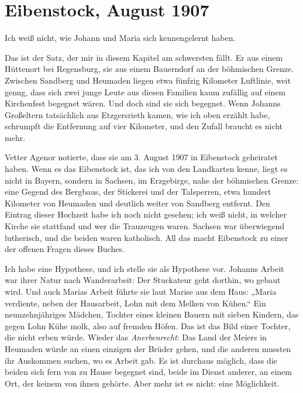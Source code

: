 \documentclass[
  ngerman,
  11pt,
  openany]{book}
\begin{document}
\section{Eibenstock, August 1907}\label{eibenstock-august-1907}

Ich weiß nicht, wie Johann und Maria sich kennengelernt haben.

Das ist der Satz, der mir in diesem Kapitel am schwersten fällt. Er aus
einem Hüttenort bei Regensburg, sie aus einem Bauerndorf an der
böhmischen Grenze. Zwischen Sandberg und Heumaden liegen etwa fünfzig
Kilometer Luftlinie, weit genug, dass sich zwei junge Leute aus diesen
Familien kaum zufällig auf einem Kirchenfest begegnet wären. Und doch
sind sie sich begegnet. Wenn Johanns Großeltern tatsächlich aus
Etzgersrieth kamen, wie ich oben erzählt habe, schrumpft die Entfernung
auf vier Kilometer, und den Zufall braucht es nicht mehr.

Vetter Agenor notierte, dass sie am 3. August 1907 in Eibenstock
geheiratet haben. Wenn es das Eibenstock ist, das ich von den Landkarten
kenne, liegt es nicht in Bayern, sondern in Sachsen, im Erzgebirge, nahe
der böhmischen Grenze: eine Gegend des Bergbaus, der Stickerei und der
Talsperren, etwa hundert Kilometer von Heumaden und deutlich weiter von
Sandberg entfernt. Den Eintrag dieser Hochzeit habe ich noch nicht
gesehen; ich weiß nicht, in welcher Kirche sie stattfand und wer die
Trauzeugen waren. Sachsen war überwiegend lutherisch, und die beiden
waren katholisch. All das macht Eibenstock zu einer der offenen Fragen
dieses Buches.

Ich habe eine Hypothese, und ich stelle sie als Hypothese vor. Johanns
Arbeit war ihrer Natur nach Wanderarbeit: Der Stuckateur geht dorthin,
wo gebaut wird. Und auch Marias Arbeit führte sie laut Marise aus dem
Haus: „Maria verdiente, neben der Hausarbeit, Lohn mit dem Melken von
Kühen.`` Ein neunzehnjähriges Mädchen, Tochter eines kleinen Bauern mit
sieben Kindern, das gegen Lohn Kühe molk, also auf fremden Höfen. Das
ist das Bild einer Tochter, die nicht erben würde. Wieder das
\emph{Anerbenrecht}: Das Land der Meiers in Heumaden würde an einen
einzigen der Brüder gehen, und die anderen mussten ihr Auskommen suchen,
wo es Arbeit gab. Es ist durchaus möglich, dass die beiden sich fern von
zu Hause begegnet sind, beide im Dienst anderer, an einem Ort, der
keinem von ihnen gehörte. Aber mehr ist es nicht: eine Möglichkeit.
\end{document}
